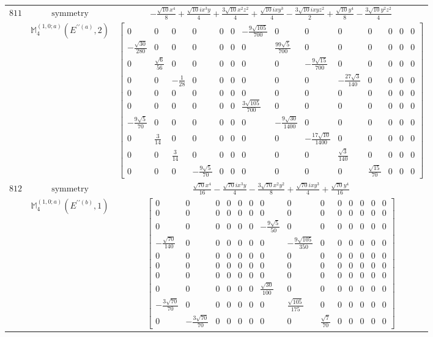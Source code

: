 \documentclass[fleqn,8pt,landscape]{jsarticle}
\begin{document}
\begin{longtable}{ccc}
$ 811 $ & $ \text{symmetry} $ & $ - \frac{\sqrt{10} x^{4}}{8} + \frac{\sqrt{10} i x^{3} y}{4} + \frac{3 \sqrt{10} x^{2} z^{2}}{4} + \frac{\sqrt{10} i x y^{3}}{4} - \frac{3 \sqrt{10} i x y z^{2}}{2} + \frac{\sqrt{10} y^{4}}{8} - \frac{3 \sqrt{10} y^{2} z^{2}}{4} $ \\
$  $ & $ \mathbb{M}_{4}^{(1,0;a)}(E^{\prime\prime(a)},2) $ & $ \begin{bmatrix} 0 & 0 & 0 & 0 & 0 & 0 & - \frac{9 \sqrt{105}}{700} & 0 & 0 & 0 & 0 & 0 & 0 & 0 \\ - \frac{\sqrt{30}}{280} & 0 & 0 & 0 & 0 & 0 & 0 & \frac{99 \sqrt{5}}{700} & 0 & 0 & 0 & 0 & 0 & 0 \\ 0 & \frac{\sqrt{6}}{56} & 0 & 0 & 0 & 0 & 0 & 0 & - \frac{9 \sqrt{15}}{700} & 0 & 0 & 0 & 0 & 0 \\ 0 & 0 & - \frac{1}{28} & 0 & 0 & 0 & 0 & 0 & 0 & - \frac{27 \sqrt{3}}{140} & 0 & 0 & 0 & 0 \\ 0 & 0 & 0 & 0 & 0 & 0 & 0 & 0 & 0 & 0 & 0 & 0 & 0 & 0 \\ 0 & 0 & 0 & 0 & 0 & 0 & \frac{3 \sqrt{105}}{700} & 0 & 0 & 0 & 0 & 0 & 0 & 0 \\ - \frac{9 \sqrt{5}}{70} & 0 & 0 & 0 & 0 & 0 & 0 & - \frac{9 \sqrt{30}}{1400} & 0 & 0 & 0 & 0 & 0 & 0 \\ 0 & \frac{3}{14} & 0 & 0 & 0 & 0 & 0 & 0 & - \frac{17 \sqrt{10}}{1400} & 0 & 0 & 0 & 0 & 0 \\ 0 & 0 & \frac{3}{14} & 0 & 0 & 0 & 0 & 0 & 0 & \frac{\sqrt{3}}{140} & 0 & 0 & 0 & 0 \\ 0 & 0 & 0 & - \frac{9 \sqrt{5}}{70} & 0 & 0 & 0 & 0 & 0 & 0 & \frac{\sqrt{15}}{70} & 0 & 0 & 0 \end{bmatrix} $ \\ \hline
$ 812 $ & $ \text{symmetry} $ & $ \frac{\sqrt{70} x^{4}}{16} - \frac{\sqrt{70} i x^{3} y}{4} - \frac{3 \sqrt{70} x^{2} y^{2}}{8} + \frac{\sqrt{70} i x y^{3}}{4} + \frac{\sqrt{70} y^{4}}{16} $ \\
$  $ & $ \mathbb{M}_{4}^{(1,0;a)}(E^{\prime\prime(b)},1) $ & $ \begin{bmatrix} 0 & 0 & 0 & 0 & 0 & 0 & 0 & 0 & 0 & 0 & 0 & 0 & 0 & 0 \\ 0 & 0 & 0 & 0 & 0 & 0 & 0 & 0 & 0 & 0 & 0 & 0 & 0 & 0 \\ 0 & 0 & 0 & 0 & 0 & 0 & - \frac{9 \sqrt{5}}{50} & 0 & 0 & 0 & 0 & 0 & 0 & 0 \\ - \frac{\sqrt{70}}{140} & 0 & 0 & 0 & 0 & 0 & 0 & - \frac{9 \sqrt{105}}{350} & 0 & 0 & 0 & 0 & 0 & 0 \\ 0 & 0 & 0 & 0 & 0 & 0 & 0 & 0 & 0 & 0 & 0 & 0 & 0 & 0 \\ 0 & 0 & 0 & 0 & 0 & 0 & 0 & 0 & 0 & 0 & 0 & 0 & 0 & 0 \\ 0 & 0 & 0 & 0 & 0 & 0 & 0 & 0 & 0 & 0 & 0 & 0 & 0 & 0 \\ 0 & 0 & 0 & 0 & 0 & 0 & \frac{\sqrt{30}}{100} & 0 & 0 & 0 & 0 & 0 & 0 & 0 \\ - \frac{3 \sqrt{70}}{70} & 0 & 0 & 0 & 0 & 0 & 0 & \frac{\sqrt{105}}{175} & 0 & 0 & 0 & 0 & 0 & 0 \\ 0 & - \frac{3 \sqrt{70}}{70} & 0 & 0 & 0 & 0 & 0 & 0 & \frac{\sqrt{7}}{70} & 0 & 0 & 0 & 0 & 0 \end{bmatrix} $ \\ \hline

\end{longtable}
\end{document}
